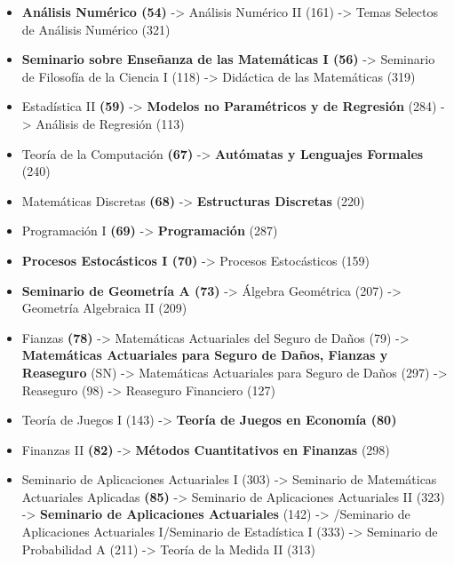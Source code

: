\begin{appendices}
\begin{itemize}
  \item \textbf{Análisis Numérico (54)} -> Análisis Numérico II (161) -> Temas Selectos de Análisis Numérico (321)
  
  \item \textbf{Seminario sobre Enseñanza de las Matemáticas I (56)} -> Seminario de Filosofía de la Ciencia I (118) -> Didáctica de las Matemáticas (319)
  
  \item Estadística II \textbf{(59)} -> \textbf{Modelos no Paramétricos y de Regresión} (284) -> Análisis de Regresión (113)
  
  \item Teoría de la Computación \textbf{(67)} -> \textbf{Autómatas y Lenguajes Formales} (240)
  
  \item Matemáticas Discretas \textbf{(68)} -> \textbf{Estructuras Discretas} (220)
  
  \item Programación I \textbf{(69)} -> \textbf{Programación} (287)
  
  \item \textbf{Procesos Estocásticos I (70)} -> Procesos Estocásticos (159)

  \item \textbf{Seminario de Geometría A (73)} -> Álgebra Geométrica (207) -> Geometría Algebraica II (209)
  
  \item Fianzas \textbf{(78)} -> Matemáticas Actuariales del Seguro de Daños (79) -> \textbf{Matemáticas Actuariales para Seguro de Daños, Fianzas y Reaseguro} (SN) -> Matemáticas Actuariales para Seguro de Daños (297) -> Reaseguro (98) -> Reaseguro Financiero (127)
  
  \item Teoría de Juegos I (143) -> \textbf{Teoría de Juegos en Economía (80)}

  \item Finanzas II \textbf{(82)} -> \textbf{Métodos Cuantitativos en Finanzas} (298)
  
  \item Seminario de Aplicaciones Actuariales I (303) -> Seminario de Matemáticas Actuariales Aplicadas \textbf{(85)} -> Seminario de Aplicaciones Actuariales II (323) -> \textbf{Seminario de Aplicaciones Actuariales} (142) -> /Seminario de Aplicaciones Actuariales I/Seminario de Estadística I (333) -> Seminario de Probabilidad A (211) -> Teoría de la Medida II (313)
  

\end{itemize}
\end{appendices}
